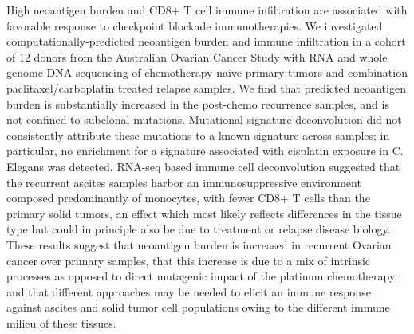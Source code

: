 High neoantigen burden and CD8+ T cell immune infiltration are associated with favorable response to checkpoint blockade immunotherapies. We investigated computationally-predicted neoantigen burden and immune infiltration in a cohort of 12 donors from the Australian Ovarian Cancer Study with RNA and whole genome DNA sequencing of chemotherapy-naive primary tumors and combination paclitaxel/carboplatin treated relapse samples. We find that predicted neoantigen burden is substantially increased in the post-chemo recurrence samples, and is not confined to subclonal mutations. Mutational signature deconvolution did not consistently attribute these mutations to a known signature across samples; in particular, no enrichment for a signature associated with cisplatin exposure in C. Elegans was detected. RNA-seq based immune cell deconvolution suggested that the recurrent ascites samples harbor an immunosuppressive environment composed predominantly of monocytes, with fewer CD8+ T cells than the primary solid tumors, an effect which most likely reflects differences in the tissue type but could in principle also be due to treatment or relapse disease biology. These results suggest that neoantigen burden is increased in recurrent Ovarian cancer over primary samples, that this increase is due to a mix of intrinsic processes as opposed to direct mutagenic impact of the platinum chemotherapy, and that different approaches may be needed to elicit an immune response against ascites and solid tumor cell populations owing to the different immune milieu of these tissues.